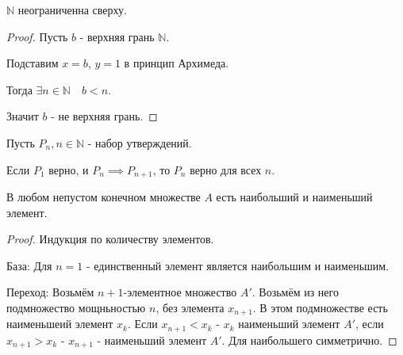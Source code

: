     \begin{lemma}
        $\mathbb{N}$ неограниченна сверху.
        \begin{proof}
            Пусть $b$ - верхняя грань  $\mathbb{N}$.
            
            Подставим $x=b$,  $y=1$ в принцип Архимеда. 
            
            Тогда $\exists{n \in \mathbb{N}}\quad b<n$.
            
            Значит $b$ -  не верхняя грань.
        \end{proof}
    \end{lemma}
    \begin{definition} \slashns

        Пусть  $P_n, n \in \mathbb{N}$ -  набор утверждений.

        Если $P_1$ верно, и  $P_n \implies P_{n+1}$, то $P_n$ верно для всех  $n$.
    \end{definition}
    \begin{theorem}
        В любом непустом конечном множестве $A$ есть наибольший и наименьший элемент.
        \begin{proof}
            Индукция по количеству элементов.

            База: Для $n=1$ - единственный элемент является наибольшим и наименьшим.

            Переход: Возьмём $n+1$-элементное множество  $A'$. Возьмём из него подмножество мощньностью  $n$, без элемента $x_{n+1}$. В этом подмножестве есть наименьшеий элемент  $x_k$. Если $x_{n+1}<x_k$ - $x_k$ наименьший элемент  $A'$, если  $x_{n+1}>x_k$ - $x_{n+1}$ - наименьший элемент $A'$. Для наибольшего симметрично.
        \end{proof}
    \end{theorem}
